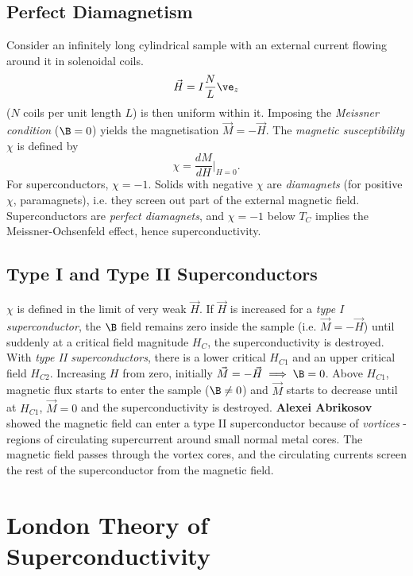 \documentclass[a4paper, 11pt, normalem]{report}
\begin{document}
\section{Perfect Diamagnetism}
Consider an infinitely long cylindrical sample with an external current flowing around it in solenoidal coils.
\begin{equation}
    \vec{H}=I\frac{N}{L}\ve_z
\end{equation}
($N$ coils per unit length $L$) is then uniform within it.
Imposing the \emph{Meissner condition} ($\B=0$) yields the magnetisation $\vec{M}=-\vec{H}$.
The \emph{magnetic susceptibility} $\chi$ is defined by
\begin{equation}
    \chi = \frac{dM}{dH}\bigg|_{H=0}.
\end{equation}
For superconductors, $\chi=-1$.
Solids with negative $\chi$ are \emph{diamagnets} (for positive $\chi$, paramagnets), i.e. they screen out part of the external magnetic field.
Superconductors are \emph{perfect diamagnets}, and $\chi=-1$ below $T_C$ implies the Meissner-Ochsenfeld effect, hence superconductivity.

\section{Type I and Type II Superconductors}
$\chi$ is defined in the limit of very weak $\vec{H}$.
If $\vec{H}$ is increased for a \emph{type I superconductor}, the $\B$ field remains zero inside the sample (i.e. $\vec{M}=-\vec{H}$) until suddenly at a critical field magnitude $H_C$, the superconductivity is destroyed.
With \emph{type II superconductors}, there is a lower critical $H_{C1}$ and an upper critical field $H_{C2}$.
Increasing $H$ from zero, initially $\vec{M}=-\vec{H}\implies\B=0$.
Above $H_{C1}$, magnetic flux starts to enter the sample ($\B\neq0$) and $\vec{M}$ starts to decrease until at $H_{C1}$, $\vec{M}=0$ and the superconductivity is destroyed.
\textbf{Alexei Abrikosov} showed the magnetic field can enter a type II superconductor because of \emph{vortices} - regions of circulating supercurrent around small normal metal cores.
The magnetic field passes through the vortex cores, and the circulating currents screen the rest of the superconductor from the magnetic field.

\chapter{London Theory of Superconductivity}
\end{document}

